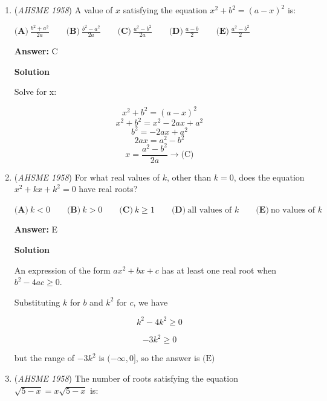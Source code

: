 \begin{enumerate}
 \textbf{Answer: }D



\textbf{Solution}

$\sqrt{\pi^2}=\pi$ is not rational, so eliminate choices $(B)$, $(C)$, and $(E)$. Note that $(-1)^3 = (-1)$, so $\sqrt[3]{-1}=-1$ is rational. We have found one rational number, so we can eliminate choice $(A)$. The answer is $\boxed{ \text{(D)}}$.

 


 


	\item (\textit{AHSME 1958}) A value of $x$ satisfying the equation $x^2 + b^2 = (a - x)^2$ is:


 $\textbf{(A)}\ \frac{b^2 + a^2}{2a}\qquad  \textbf{(B)}\ \frac{b^2 - a^2}{2a}\qquad  \textbf{(C)}\ \frac{a^2 - b^2}{2a}\qquad  \textbf{(D)}\ \frac{a - b}{2}\qquad  \textbf{(E)}\ \frac{a^2 - b^2}{2}$

 \textbf{Answer: }C



\textbf{Solution}

Solve for x:

 
 \[x^2+b^2=(a-x)^2\]
 \[x^2+b^2=x^2-2ax+a^2\]
 \[b^2=-2ax+a^2\]
 \[2ax=a^2-b^2\]
 \[x=\frac{a^2-b^2}{2a} \to \boxed{\text{(C)}}\]



	\item (\textit{AHSME 1958}) For what real values of $k$, other than $k = 0$, does the equation $x^2 + kx + k^2 = 0$ have real roots?


 $\textbf{(A)}\ {k < 0}\qquad  \textbf{(B)}\ {k > 0} \qquad  \textbf{(C)}\ {k \ge 1} \qquad  \textbf{(D)}\ \text{all values of }{k}\qquad  \textbf{(E)}\ \text{no values of }{k}$

 \textbf{Answer: }E



\textbf{Solution}

An expression of the form $ax^2+bx+c$ has at least one real root when $b^2-4ac \geq 0$.

 Substituting $k$ for $b$ and $k^2$ for $c$, we have 

 
 \[k^2-4k^2 \geq 0\]

 \[-3k^2 \geq 0\]

 but the range of $-3k^2$ is $(-\infty,0]$, so the answer is $\boxed{\text{(E)}}$



	\item (\textit{AHSME 1958}) The number of roots satisfying the equation $\sqrt{5 - x} = x\sqrt{5 - x}$ is:



\end{enumerate}

